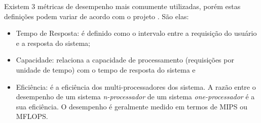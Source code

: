    Existem 3 métricas de desempenho mais comumente utilizadas, porém estas definições podem variar de acordo com o projeto \cite{Jain}. São elas:
    \begin{itemize}
    \item Tempo de Resposta: é definido como o intervalo entre a requisição do usuário e a resposta do sistema;
    \item Capacidade: relaciona a capacidade de processamento (requisições por unidade de tempo)  com o tempo de resposta do sistema e
    \item Eficiência: é a eficiência dos multi-processadores dos sistema. A razão entre o desempenho de um sistema \textit{n-processador} de um sistema \textit{one-processador} é a sua eficiência. O desempenho é geralmente medido em termos de MIPS ou MFLOPS.
    \end{itemize}
